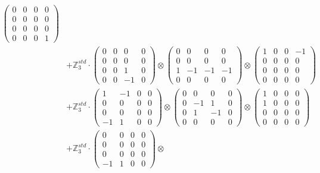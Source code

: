 \documentclass{article}
\begin{document}
{\begin{align}
            \begin{pmatrix} 0 & 0 & 0 & 0 \\ 0 & 0 & 0 & 0 \\ 0 & 0 & 0 & 0 \\ 0 & 0 & 0 & 1 \end{pmatrix} \\ 
        &+ \label{Rs1-Rc16-Solution-2-c15} \mathbb{Z}_3^{std} \cdot 
            \begin{pmatrix} 0 & 0 & 0 & 0 \\ 0 & 0 & 0 & 0 \\ 0 & 0 & 1 & 0 \\ 0 & 0 & -1 & 0 \end{pmatrix} \otimes 
            \begin{pmatrix} 0 & 0 & 0 & 0 \\ 0 & 0 & 0 & 0 \\ 1 & -1 & -1 & -1 \\ 0 & 0 & 0 & 0 \end{pmatrix} \otimes 
            \begin{pmatrix} 1 & 0 & 0 & -1 \\ 0 & 0 & 0 & 0 \\ 0 & 0 & 0 & 0 \\ 0 & 0 & 0 & 0 \end{pmatrix} \\ 
        &+ \label{Rs1-Rc16-Solution-2-c16} \mathbb{Z}_3^{std} \cdot 
            \begin{pmatrix} 1 & -1 & 0 & 0 \\ 0 & 0 & 0 & 0 \\ 0 & 0 & 0 & 0 \\ -1 & 1 & 0 & 0 \end{pmatrix} \otimes 
            \begin{pmatrix} 0 & 0 & 0 & 0 \\ 0 & -1 & 1 & 0 \\ 0 & 1 & -1 & 0 \\ 0 & 0 & 0 & 0 \end{pmatrix} \otimes 
            \begin{pmatrix} 1 & 0 & 0 & 0 \\ 1 & 0 & 0 & 0 \\ 0 & 0 & 0 & 0 \\ 0 & 0 & 0 & 0 \end{pmatrix} \\ 
        &+ \label{Rs1-Rc16-Solution-2-c17} \mathbb{Z}_3^{std} \cdot 
            \begin{pmatrix} 0 & 0 & 0 & 0 \\ 0 & 0 & 0 & 0 \\ 0 & 0 & 0 & 0 \\ -1 & 1 & 0 & 0 \end{pmatrix} \otimes 

\end{align}}
\end{document}
